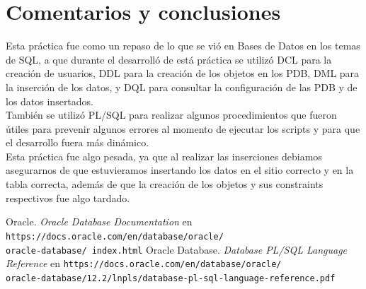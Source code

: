 \documentclass{article}
\begin{document}
\section*{Comentarios y conclusiones}

Esta práctica fue como un repaso de lo que se vió en Bases de Datos
en los temas de SQL, a que durante el desarrolló de está práctica se 
utilizó DCL para la creación de usuarios, DDL para la creación de los 
objetos en los PDB, DML para la inserción de los datos, y DQL para 
consultar la configuración de las PDB y de los datos insertados. \\

También se utilizó PL/SQL para realizar algunos procedimientos que fueron 
útiles para prevenir algunos errores al momento de ejecutar los scripts y 
para que el desarrollo fuera más dinámico.\\

Esta práctica fue algo pesada, ya que al realizar las inserciones debiamos 
asegurarnos de que estuvieramos insertando los datos en el sitio correcto 
y en la tabla correcta, además de que la creación de los objetos y sus 
constraints respectivos fue algo tardado. \\

\renewcommand\refname{Bibliografía}
\begin{thebibliography}{99}
     Oracle. \textit{Oracle Database Documentation} en 
        \texttt{https://docs.oracle.com/en/database/oracle/\\oracle-database/%
        index.html}
     Oracle Database. \textit{Database PL/SQL Language 
        Reference} en 
        \texttt{https://docs.oracle.com/en/database/oracle/\\
        oracle-database/12.2/lnpls/database-pl-sql-language-reference.pdf}
\end{thebibliography}
\end{document}
